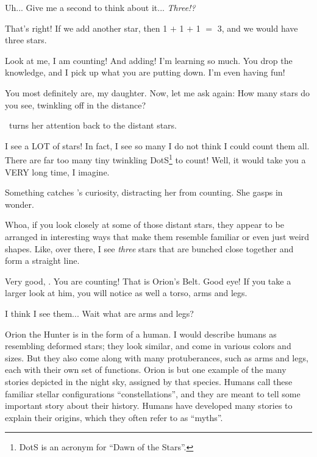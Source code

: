 \documentclass[main.tex]{subfiles}
\begin{document}
\par \Maia Uh... Give me a second to think about it... \textit{Three!?}

\par \Pleione That's right!  If we add another star, then 1 $+$ 1 $+$ 1 $=$ 3, and we would have three stars.  

\par \Maia Look at me, I am counting!  And adding!  I'm learning so much.  You drop the knowledge, and I pick up what you are putting down.  I'm even having fun!

\par \Pleione You most definitely are, my daughter.  Now, let me ask again:  How many stars do you see, twinkling off in the distance?

\par \nar \rmmaia~turns her attention back to the distant stars.  

\par \Maia I see a LOT of stars!  In fact, I see so many I do not think I could count them all.  There are far too many tiny twinkling DotS\footnote{DotS is an acronym for ``Dawn of the Stars''.} to count!  Well, it would take you a VERY long time, I imagine.

\par \nar Something catches \rmmaia's curiosity, distracting her from counting.  She gasps in wonder.

\par \Maia Whoa, if you look closely at some of those distant stars, they appear to be arranged in interesting ways that make them resemble familiar or even just weird shapes.  Like, over there, I see \textit{three} stars that are bunched close together and form a straight line.

\par \Pleione Very good, \rmmaia.  You are counting!  That is Orion's Belt.  Good eye!  If you take a larger look at him, you will notice as well a torso, arms and legs.  

\par \Maia I think I see them... Wait what are arms and legs?  

\par \Pleione Orion the Hunter is in the form of a human.  I would describe humans as resembling deformed stars; they look similar, and come in various colors and sizes.  But they also come along with many protuberances, such as arms and legs, each with their own set of functions.   Orion is but one example of the many stories depicted in the night sky, assigned by that species.  Humans call these familiar stellar configurations ``constellations'', and they are meant to tell some important story about their history.  Humans have developed many stories to explain their origins, which they often refer to as ``myths''.
\end{document}
